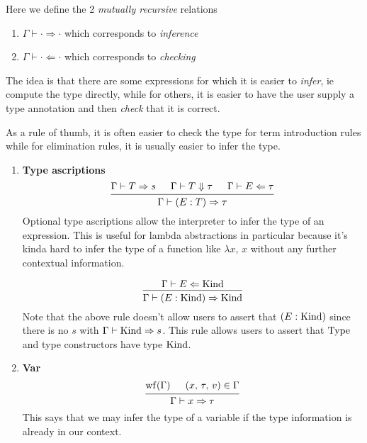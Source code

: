 \documentclass{article}
\begin{document}
\begin{definition} 
  Here we define the 2 \textit{mutually recursive} relations
  \begin{enumerate}
  \item$\Gamma \vdash \cdot \Rightarrow \cdot $ which corresponds to \textit{inference}
  \item$\Gamma \vdash \cdot \Leftarrow \cdot$ which corresponds to \textit{checking}
  \end{enumerate}

  The idea is that there are some expressions for which it is easier to
  \textit{infer},
  ie compute the type directly, while for others, it is easier to have the user
  supply a type annotation and then \textit{check} that it is correct.

  As a rule of thumb, it is often easier to check the type for term
  introduction rules while for elimination rules, it is usually easier to infer
  the type.

  \begin{enumerate}

  \item \textbf{Type ascriptions} \\
    \[
      \begin{prooftree}
        \hypo{\Gamma \vdash T \Rightarrow s}
        \hypo{\Gamma \vdash T \Downarrow \tau}
        \hypo{\Gamma \vdash E \Leftarrow \tau}
        \infer3{\Gamma \vdash (E : T) \Rightarrow \tau}
      \end{prooftree}
    \]
    Optional type ascriptions allow the interpreter to infer the type of an
    expression. This is useful for lambda abstractions in particular because it's
    kinda hard to infer the type of a function like $\lambda x, \, x$ without any
    further contextual information.

    \[
      \begin{prooftree}
        \hypo{\Gamma \vdash E \Leftarrow \Kind}
        \infer1{\Gamma \vdash (E : \Kind) \Rightarrow \Kind}
      \end{prooftree}
    \]
    Note that the above rule doesn't allow users to assert that $(E : \operatorname{Kind})$
    since there is no $s$ with $\Gamma \vdash \operatorname{Kind} \Rightarrow s$.
    This rule allows users to assert that $\operatorname{Type}$ and type constructors
    have type $\operatorname{Kind}$.
    
  \item \textbf{Var} \\
    \[
      \begin{prooftree}
        \hypo{\wf(\Gamma)}
        \hypo{(x, \, \tau, \, v) \in \Gamma}
        \infer2{\Gamma \vdash x \Rightarrow \tau}
      \end{prooftree}
    \]
    This says that we may infer the type of a variable if the type information
    is already in our context.


\end{enumerate}
\end{definition}
\end{document}

